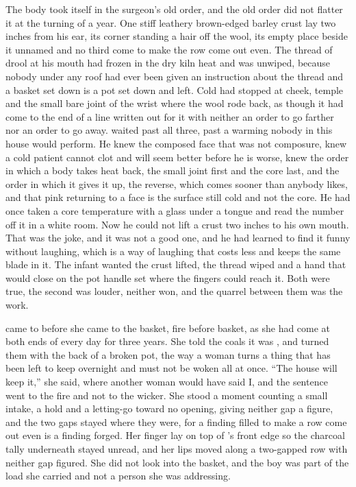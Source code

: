 The body took itself in the surgeon's old order, and the old order did not flatter it at the turning of a year. One stiff leathery brown-edged barley crust lay two inches from his ear, its corner standing a hair off the wool, its empty place beside it unnamed and no third come to make the row come out even. The thread of drool at his mouth had frozen in the dry kiln heat and was unwiped, because nobody under any roof had ever been given an instruction about the thread and a basket set down is a pot set down and left. Cold had stopped at cheek, temple and the small bare joint of the wrist where the wool rode back, as though it had come to the end of a line written out for it with neither an order to go farther nor an order to go away.  waited past all three, past a warming nobody in this house would perform. He knew the composed face that was not composure, knew a cold patient cannot clot and will seem better before he is worse, knew the order in which a body takes heat back, the small joint first and the core last, and the order in which it gives it up, the reverse, which comes sooner than anybody likes, and that pink returning to a face is the surface still cold and not the core. He had once taken a core temperature with a glass under a tongue and read the number off it in a white room. Now he could not lift a crust two inches to his own mouth. That was the joke, and it was not a good one, and he had learned to find it funny without laughing, which is a way of laughing that costs less and keeps the same blade in it. The infant wanted the crust lifted, the thread wiped and a hand that would close on the pot handle set where the fingers could reach it. Both were true, the second was louder, neither won, and the quarrel between them was the work.

\scenebreak

 came to  before she came to the basket, fire before basket, as she had come at both ends of every day for three years. She told the coals it was , and turned them with the back of a broken pot, the way a woman turns a thing that has been left to keep overnight and must not be woken all at once. “The house will keep it,” she said, where another woman would have said I, and the sentence went to the fire and not to the wicker. She stood a moment counting a small intake, a hold and a letting-go toward no opening, giving neither gap a figure, and the two gaps stayed where they were, for a finding filled to make a row come out even is a finding forged. Her finger lay on top of 's front edge so the charcoal tally underneath stayed unread, and her lips moved along a two-gapped row with neither gap figured. She did not look into the basket, and the boy was part of the load she carried and not a person she was addressing.

